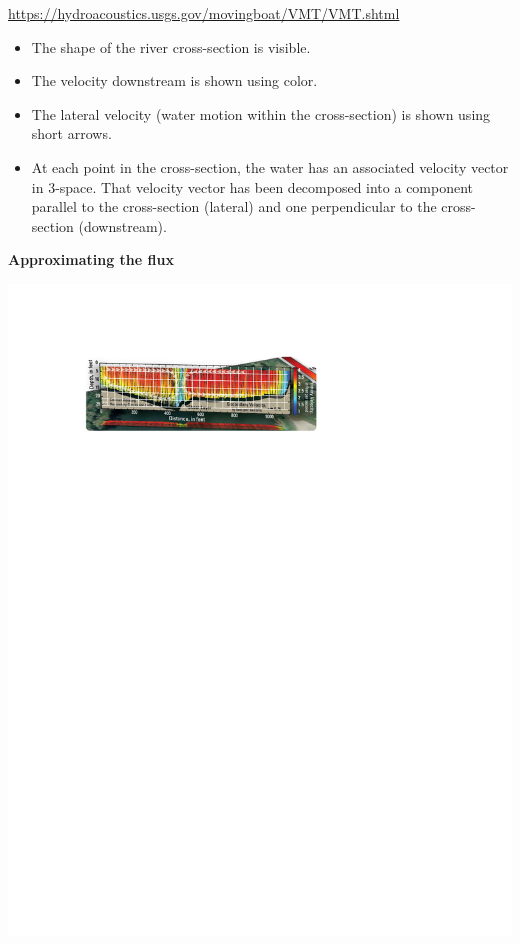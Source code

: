 \documentclass[12pt,letterpaper,noanswers]{exam}
\begin{document}
\url{https://hydroacoustics.usgs.gov/movingboat/VMT/VMT.shtml}

\begin{itemize}
\setlength{\itemsep}{0em}
    \item The shape of the river cross-section is visible.
    \item The velocity downstream is shown using color.
    \item The lateral velocity (water motion within the cross-section) is shown using short arrows.
    \item At each point in the cross-section, the water has an associated velocity vector in 3-space.  That velocity vector has been decomposed into a component parallel to the cross-section (lateral) and one perpendicular to the cross-section (downstream).
\end{itemize}

\noindent\textbf{Approximating the flux}

\includegraphics{img/C01adcpUSGS-3.pdf}
\end{document}
